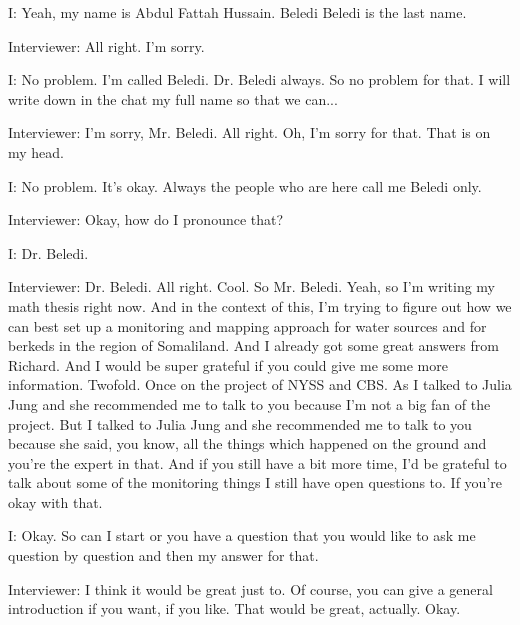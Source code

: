 I: Yeah, my name is Abdul Fattah Hussain. Beledi Beledi is the last name. 

Interviewer:  All right. I'm sorry. 

I: No problem. I'm called Beledi. Dr. Beledi always. So no problem for that. I will write down in the chat my full name so that we can... 

Interviewer:   I'm sorry, Mr. Beledi. All right. Oh, I'm sorry for that. That is on my head. 

I: No problem. It's okay. Always the people who are here call me Beledi only. 

Interviewer:  Okay, how do I pronounce that? 

I: Dr. Beledi. 

Interviewer:  Dr. Beledi. All right. Cool. So Mr. Beledi. Yeah, so I'm writing my math thesis right now. And in the context of this, I'm trying to figure out how we can best set up a monitoring and mapping approach for water sources and for berkeds in the region of Somaliland. And I already got some great answers from Richard. And I would be super grateful if you could give me some more information. Twofold. Once on the project of NYSS and CBS. As I talked to Julia Jung and she recommended me to talk to you because I'm not a big fan of the project. But I talked to Julia Jung and she recommended me to talk to you because she said, you know, all the things which happened on the ground and you're the expert in that. And if you still have a bit more time, I'd be grateful to talk about some of the monitoring things I still have open questions to. If you're okay with that.

I: Okay. So can I start or you have a question that you would like to ask me question by question and then my answer for that. 

Interviewer:  I think it would be great just to. Of course, you can give a general introduction if you want, if you like. That would be great, actually. Okay. 

